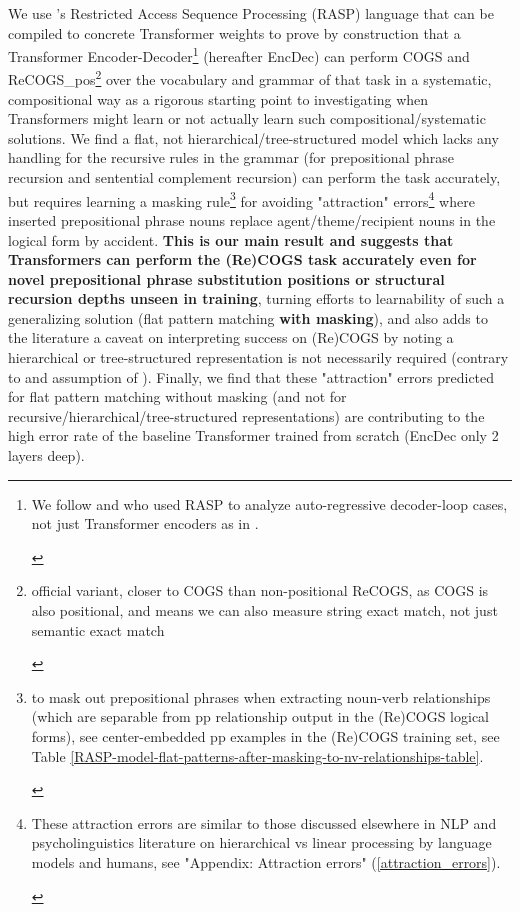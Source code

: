 \documentclass[11pt]{article}
\begin{document}
We use \citep{Weiss2021}'s Restricted Access Sequence Processing (RASP) language that can be compiled to concrete Transformer weights to prove by construction that a Transformer Encoder-Decoder\footnote{\begin{footnotesize}We follow \citep{Zhou2024} and \citep{friedmanrepresentingrulebasedchatbotstransformers} who used RASP to analyze auto-regressive decoder-loop cases, not just Transformer encoders as in \citep{Weiss2021}.\end{footnotesize}} (hereafter EncDec) can perform COGS and ReCOGS\_pos\footnote{\begin{footnotesize}official variant, closer to COGS than non-positional ReCOGS, as COGS is also positional, and means we can also measure string exact match, not just semantic exact match\end{footnotesize}} over the vocabulary and grammar of that task in a systematic, compositional way as a rigorous starting point to investigating when Transformers might learn or not actually learn such compositional/systematic solutions. We find a flat, not hierarchical/tree-structured model which lacks any handling for the recursive rules in the grammar (for prepositional phrase recursion and sentential complement recursion) can perform the task accurately, but requires learning a masking rule\footnote{\begin{footnotesize}to mask out prepositional phrases when extracting noun-verb relationships (which are separable from pp relationship output in the (Re)COGS logical forms), see center-embedded pp examples in the (Re)COGS training set, see Table \ref{RASP-model-flat-patterns-after-masking-to-nv-relationships-table}.\end{footnotesize}} for avoiding "attraction" errors\footnote{\begin{footnotesize}These attraction errors are similar to those discussed elsewhere in NLP and psycholinguistics literature on hierarchical vs linear processing by language models and humans, see "Appendix: Attraction errors" (\ref{attraction_errors}).\end{footnotesize}} where inserted prepositional phrase nouns replace agent/theme/recipient nouns in the logical form by accident. \textbf{This is our main result and suggests that Transformers can perform the (Re)COGS task accurately even for novel prepositional phrase substitution positions or structural recursion depths unseen in training}, turning efforts to learnability of such a generalizing solution (flat pattern matching \textbf{with masking}), and also adds to the literature a caveat on interpreting success on (Re)COGS by noting a hierarchical or tree-structured representation is not necessarily required (contrary to \citep{KimLinzen2020} and assumption of \citep{murty2022characterizingintrinsiccompositionalitytransformers}). Finally, we find that these "attraction" errors predicted for flat pattern matching without masking (and not for recursive/hierarchical/tree-structured representations) are contributing to the high error rate of the \citep{Wu2023} baseline Transformer trained from scratch (EncDec only 2 layers deep).
\end{document}
